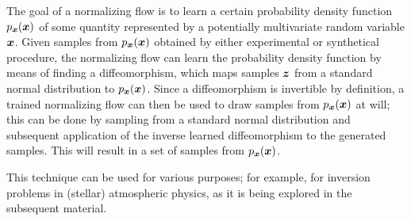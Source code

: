 \documentclass[a4paper,12pt]{report}
\begin{document}
The goal of a normalizing flow is to learn a certain probability density function $p_{\bm{x}}(\bm{x})$ of some quantity represented by a potentially multivariate random variable $\bm{x}$. Given samples from $p_{\bm{x}}(\bm{x})$ obtained by either experimental or synthetical procedure, the normalizing flow can learn the probability density function by means of finding a diffeomorphism, which maps samples $\bm{z}$ from a standard normal distribution to $p_{\bm{x}}(\bm{x})$. Since a diffeomorphism is invertible by definition, a trained normalizing flow can then be used to draw samples from $p_{\bm{x}}(\bm{x})$ at will; this can be done by sampling from a standard normal distribution and subsequent application of the inverse learned diffeomorphism to the generated samples. This will result in a set of samples from $p_{\bm{x}}(\bm{x})$.

This technique can be used for various purposes; for example, for inversion problems in (stellar) atmospheric physics, as it is being explored in the subsequent material.

%
\end{document}
